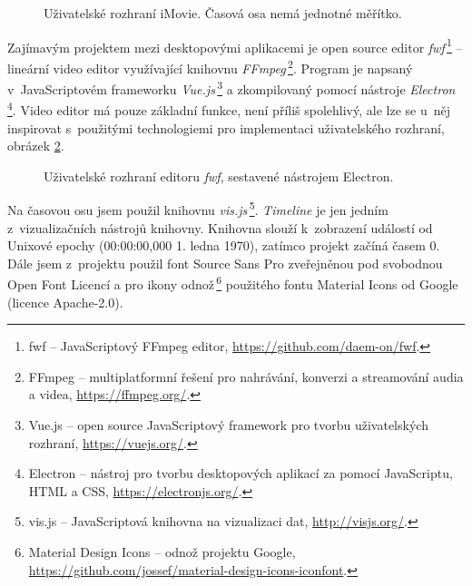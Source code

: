 \begin{figure}[h]
	\centering
	\caption{Uživatelské rozhraní iMovie. Časová osa nemá jednotné měřítko.}\label{img:imovie}
\end{figure}

Zajímavým projektem mezi desktopovými aplikacemi je open source editor \textit{fwf}\,\footnote{fwf -- JavaScriptový FFmpeg editor, \url{https://github.com/daem-on/fwf}.} -- lineární video editor využívající knihovnu \textit{FFmpeg}\,\footnote{FFmpeg -- multiplatformní řešení pro nahrávání, konverzi a streamování audia a videa, \url{https://ffmpeg.org/}.}. Program je napsaný v~JavaScriptovém frameworku \textit{Vue.js}\,\footnote{Vue.js -- open source JavaScriptový framework pro tvorbu uživatelských rozhraní, \url{https://vuejs.org/}.} a zkompilovaný pomocí nástroje \textit{Electron}\,\footnote{Electron -- nástroj pro tvorbu desktopových aplikací za pomocí JavaScriptu, HTML a CSS, \url{https://electronjs.org/}.}. Video editor má pouze základní funkce, není příliš spolehlivý, ale lze se u~něj inspirovat s~použitými technologiemi pro implementaci uživatelského rozhraní, obrázek \ref{img:fwf}.
\begin{figure}[h]
	\centering
	\caption{Uživatelské rozhraní editoru \textit{fwf}, sestavené nástrojem Electron.}\label{img:fwf}
\end{figure}
Na časovou osu jsem použil knihovnu \textit{vis.js}\,\footnote{vis.js -- JavaScriptová knihovna na vizualizaci dat, \url{http://visjs.org/}.}. \textit{Timeline} je jen jedním z~vizualizačních nástrojů knihovny. Knihovna slouží k~zobrazení událostí od Unixové epochy (00:00:00,000 1. ledna 1970), zatímco projekt začíná časem 0. Dále jsem z~projektu použil font Source Sans Pro zveřejněnou pod svobodnou Open Font Licencí a pro ikony odnož\,\footnote{Material Design Icons -- odnož projektu Google, \url{https://github.com/jossef/material-design-icons-iconfont}.} použitého fontu Material Icons od Google (licence Apache-2.0).

